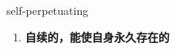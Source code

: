 
\begin{frame}
{\huge self-perpetuating}
\begin{center}
\begin{enumerate}\Large
  \item \textbf{自续的，能使自身永久存在的}
\end{enumerate}
\end{center}
\end{frame}
